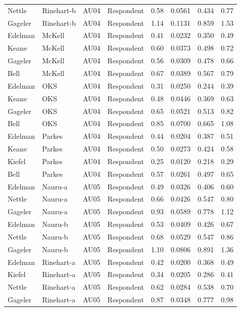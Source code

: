 \documentclass{monashthesis}
\begin{document}
\begin{center}
\begin{longtable}{llllllll}
Nettle & Rinehart-b & AU04 & Respondent & 0.58 & 0.0561 & 0.434 & 0.77 \\
Gageler & Rinehart-b & AU04 & Respondent & 1.14 & 0.1131 & 0.859 & 1.53 \\
Edelman & McKell & AU04 & Respondent & 0.41 & 0.0232 & 0.350 & 0.49 \\
Keane & McKell & AU04 & Respondent & 0.60 & 0.0373 & 0.498 & 0.72 \\
Gageler & McKell & AU04 & Respondent & 0.56 & 0.0309 & 0.478 & 0.66 \\
Bell & McKell & AU04 & Respondent & 0.67 & 0.0389 & 0.567 & 0.79 \\
Edelman & OKS & AU04 & Respondent & 0.31 & 0.0250 & 0.244 & 0.39 \\
Keane & OKS & AU04 & Respondent & 0.48 & 0.0446 & 0.369 & 0.63 \\
Gageler & OKS & AU04 & Respondent & 0.65 & 0.0521 & 0.513 & 0.82 \\
Bell & OKS & AU04 & Respondent & 0.85 & 0.0700 & 0.665 & 1.08 \\
Edelman & Parkes & AU04 & Respondent & 0.44 & 0.0204 & 0.387 & 0.51 \\
Keane & Parkes & AU04 & Respondent & 0.50 & 0.0273 & 0.424 & 0.58 \\
Kiefel & Parkes & AU04 & Respondent & 0.25 & 0.0120 & 0.218 & 0.29 \\
Bell & Parkes & AU04 & Respondent & 0.57 & 0.0261 & 0.497 & 0.65 \\
Edelman & Nauru-a & AU05 & Respondent & 0.49 & 0.0326 & 0.406 & 0.60 \\
Nettle & Nauru-a & AU05 & Respondent & 0.66 & 0.0426 & 0.547 & 0.80 \\
Gageler & Nauru-a & AU05 & Respondent & 0.93 & 0.0589 & 0.778 & 1.12 \\
Edelman & Nauru-b & AU05 & Respondent & 0.53 & 0.0409 & 0.426 & 0.67 \\
Nettle & Nauru-b & AU05 & Respondent & 0.68 & 0.0529 & 0.547 & 0.86 \\
Gageler & Nauru-b & AU05 & Respondent & 1.10 & 0.0806 & 0.891 & 1.36 \\
Edelman & Rinehart-a & AU05 & Respondent & 0.42 & 0.0200 & 0.368 & 0.49 \\
Kiefel & Rinehart-a & AU05 & Respondent & 0.34 & 0.0205 & 0.286 & 0.41 \\
Nettle & Rinehart-a & AU05 & Respondent & 0.62 & 0.0284 & 0.538 & 0.70 \\
Gageler & Rinehart-a & AU05 & Respondent & 0.87 & 0.0348 & 0.777 & 0.98 \\

\end{longtable}
\end{center}
\end{document}
